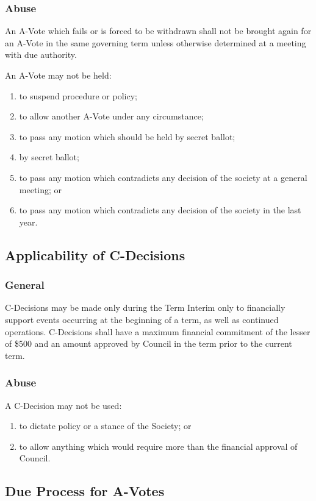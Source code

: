 \subsubsection{Abuse}
An A-Vote which fails or is forced to be withdrawn shall not be brought again for an A-Vote in the same governing term unless otherwise determined at a meeting with due authority.

An A-Vote may not be held:
\begin{enumerate}
    \item to suspend procedure or policy;
    \item to allow another A-Vote under any circumstance;
    \item to pass any motion which should be held by secret ballot;
    \item by secret ballot;
    \item to pass any motion which contradicts any decision of the society at a general meeting; or
    \item to pass any motion which contradicts any decision of the society in the last year.
\end{enumerate}

\subsection{Applicability of C-Decisions}

\subsubsection{General}
C-Decisions may be made only during the Term Interim only to financially support events occurring at the 
beginning of a term, as well as continued operations. C-Decisions shall have a maximum financial commitment 
of the lesser of \$500 and an amount approved by Council in the term prior to the current term.

\subsubsection{Abuse}
A C-Decision may not be used:
\begin{enumerate}
    \item to dictate policy or a stance of the Society; or 
    \item to allow anything which would require more than the financial approval of Council. 
\end{enumerate}

\subsection{Due Process for A-Votes}

